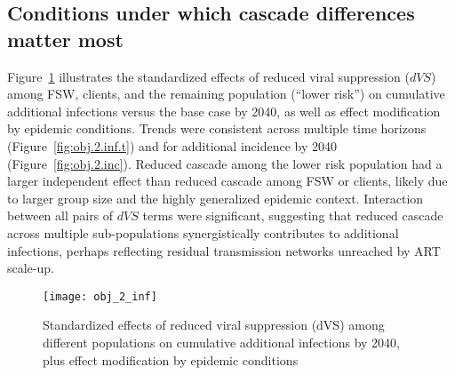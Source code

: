 \subsection{Conditions under which cascade differences matter most}
Figure~\ref{fig:obj.2.inf} illustrates the standardized effects of
reduced viral suppression ($dVS$)
among FSW, clients, and the remaining population (``lower risk'')
on cumulative additional infections versus the base case by 2040,
as well as effect modification by epidemic conditions.
Trends were consistent across multiple time horizons (Figure~\ref{fig:obj.2.inf.t})
and for additional incidence by 2040 (Figure~\ref{fig:obj.2.inc}).
Reduced cascade among the lower risk population
had a larger independent effect than reduced cascade among FSW or clients,
likely due to larger group size and the highly generalized epidemic context.
Interaction between all pairs of $dVS$ terms were significant,
suggesting that reduced cascade across multiple sub-populations
synergistically contributes to additional infections,
perhaps reflecting residual transmission networks unreached by ART scale-up.
\begin{figure}
  \texttt{[image: obj\_2\_inf]}
  \caption{Standardized effects of reduced viral suppression (dVS) among different populations
    on cumulative additional infections by 2040,
    plus effect modification by epidemic conditions}
  \label{fig:obj.2.inf}
\end{figure}
\par
